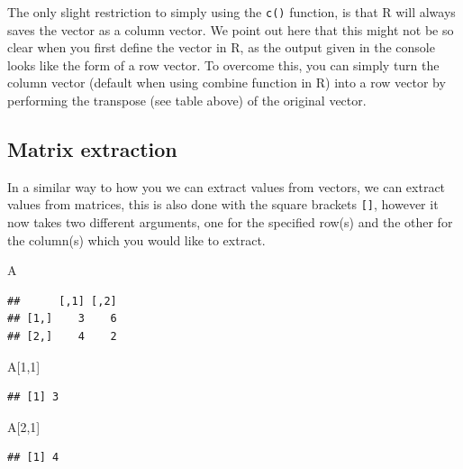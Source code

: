 \documentclass[
]{book}
\newenvironment{Shaded}{\begin{snugshade}}{\end{snugshade}}
\newcommand{\DecValTok}[1]{\textcolor[rgb]{0.00,0.00,0.81}{#1}}
\newcommand{\NormalTok}[1]{#1}
\theoremstyle{definition}
\theoremstyle{definition}
\theoremstyle{definition}
\theoremstyle{definition}
\theoremstyle{remark}
\begin{document}
The only slight restriction to simply using the \texttt{c()} function, is that R will always saves the vector as a column vector. We point out here that this might not be so clear when you first define the vector in R, as the output given in the console looks like the form of a row vector. To overcome this, you can simply turn the column vector (default when using combine function in R) into a row vector by performing the transpose (see table above) of the original vector.

\hypertarget{matrix-extraction}{%
\subsection{Matrix extraction}\label{matrix-extraction}}

In a similar way to how you we can extract values from vectors, we can extract values from matrices, this is also done with the square brackets \texttt{{[}{]}}, however it now takes two different arguments, one for the specified row(s) and the other for the column(s) which you would like to extract.

\begin{Shaded}
\begin{Highlighting}[]
\NormalTok{A}
\end{Highlighting}
\end{Shaded}

\begin{verbatim}
##      [,1] [,2]
## [1,]    3    6
## [2,]    4    2
\end{verbatim}

\begin{Shaded}
\begin{Highlighting}[]
\NormalTok{A[}\DecValTok{1}\NormalTok{,}\DecValTok{1}\NormalTok{]}
\end{Highlighting}
\end{Shaded}

\begin{verbatim}
## [1] 3
\end{verbatim}

\begin{Shaded}
\begin{Highlighting}[]
\NormalTok{A[}\DecValTok{2}\NormalTok{,}\DecValTok{1}\NormalTok{]}
\end{Highlighting}
\end{Shaded}

\begin{verbatim}
## [1] 4
\end{verbatim}
\end{document}

